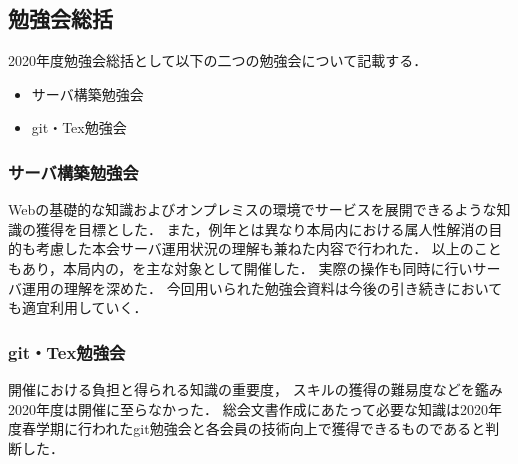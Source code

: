 \subsection*{勉強会総括}


2020年度勉強会総括として以下の二つの勉強会について記載する．
\begin{itemize}
    \item サーバ構築勉強会
    \item git・Tex勉強会
\end{itemize}

\subsubsection*{サーバ構築勉強会}
Webの基礎的な知識およびオンプレミスの環境でサービスを展開できるような知識の獲得を目標とした．
また，例年とは異なり本局内における属人性解消の目的も考慮した本会サーバ運用状況の理解も兼ねた内容で行われた．
以上のこともあり，本局内の\firstGrade{}，\secondGrade{}を主な対象として開催した．
実際の操作も同時に行いサーバ運用の理解を深めた．
今回用いられた勉強会資料は今後の引き続きにおいても適宜利用していく．

\subsubsection*{git・Tex勉強会}
開催における負担と得られる知識の重要度，
スキルの獲得の難易度などを鑑み2020年度は開催に至らなかった．
総会文書作成にあたって必要な知識は2020年度春学期に行われたgit勉強会と各会員の技術向上で獲得できるものであると判断した．
